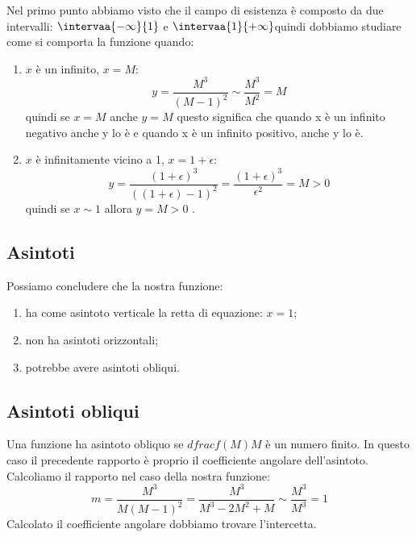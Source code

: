 \begin{minipage}{.60\linewidth}
Nel primo punto abbiamo visto che il campo di esistenza è composto da due 
intervalli: \(\intervaa{-\infty}{1}\) e \(\intervaa{1}{+\infty}\)quindi 
dobbiamo studiare come si comporta la funzione quando:

\begin{enumerate} [nosep]
 \item \(x\) è un infinito, \(x=M\):
 \[y=\frac{M^3}{(M-1)^2} \sim \frac{M^3}{M^2} = M\]
 quindi se \(x=M\) anche \(y=M\) questo significa che quando x è un infinito 
negativo anche y lo è e quando x è un infinito positivo, anche y lo è.
 \item \(x\) è infinitamente vicino a 1, \(x=1+\epsilon\):\
\[y=\frac{(1+\epsilon)^3}{((1+\epsilon)-1)^2}=
    \frac{(1+\epsilon)^3}{\epsilon^2}= M > 0\]
 quindi se \(x \sim 1\) allora \(y=M>0\) .
\end{enumerate}
\end{minipage}
\hfill
\begin{minipage}{.38\linewidth}
 \begin{center}
\asintoticofunzionea
 \end{center}
\end{minipage}

\subsection{Asintoti}

Possiamo concludere che la nostra funzione:

\begin{enumerate} [nosep]
 \item ha come asintoto verticale la retta di equazione: \(x=1\);
 \item non ha asintoti orizzontali;
 \item potrebbe avere asintoti obliqui.
\end{enumerate}

\subsection{Asintoti obliqui}

Una funzione ha asintoto obliquo se \(dfrac{f(M)}{M}\) è un numero finito. In 
questo caso il precedente rapporto è proprio il coefficiente angolare 
dell'asintoto. Calcoliamo il rapporto nel caso della nostra funzione:
\[m=\frac{M^3}{M(M-1)^2} = \frac{M^3}{M^3 -2M^2 +M} \sim \frac{M^3}{M^3} = 1\]
Calcolato il coefficiente angolare dobbiamo trovare l'intercetta.

